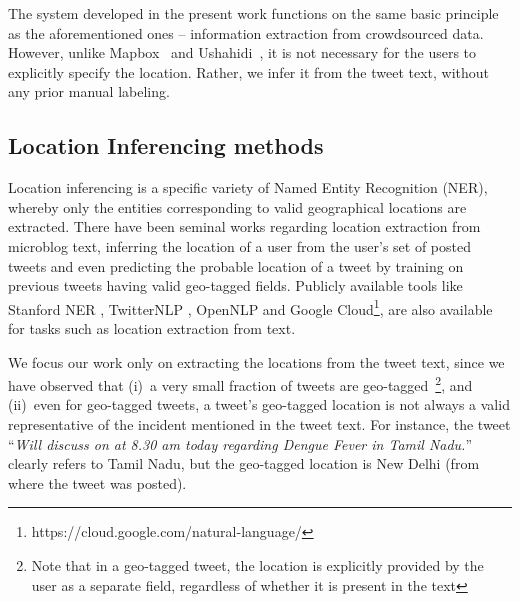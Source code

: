 The system developed in the present work functions on the same basic principle as the aforementioned ones -- information extraction from crowdsourced data. 
However, unlike Mapbox~\cite{Mapbox} and Ushahidi~\cite{Ushahidi}, it is not necessary for the users to explicitly specify the location. Rather, we infer it from the tweet text, without any prior manual labeling. 


\subsection{Location Inferencing methods}

Location inferencing is a specific variety of Named Entity Recognition (NER), whereby only the entities corresponding to valid geographical locations are extracted. 
There have been seminal works regarding location extraction from microblog text, inferring the location of a user from the user's set of posted tweets and even predicting the probable location of a tweet by training on previous tweets having valid geo-tagged fields.
Publicly available tools like Stanford NER \cite{StanfordNER}, TwitterNLP \cite{TwitterNLP1}, OpenNLP \cite{OpenNLP} and Google Cloud\footnote{https://cloud.google.com/natural-language/}, are also available for tasks such as location extraction from text.

We focus our work only on extracting the locations from the tweet text, since we have observed that 
(i)~a very small fraction of tweets are geo-tagged~\footnote{Note that in a geo-tagged tweet, the location is explicitly provided by the user as a separate field, regardless of whether it is present in the text}, and 
(ii)~even for geo-tagged tweets, a tweet's geo-tagged location is not always a valid representative of the incident mentioned in the tweet text. 
For instance, the tweet ``{\it Will discuss on \@TimesNow at 8.30 am today regarding Dengue Fever in Tamil Nadu.}'' clearly refers to Tamil Nadu, 
but the geo-tagged location is New Delhi (from where the tweet was posted). 



